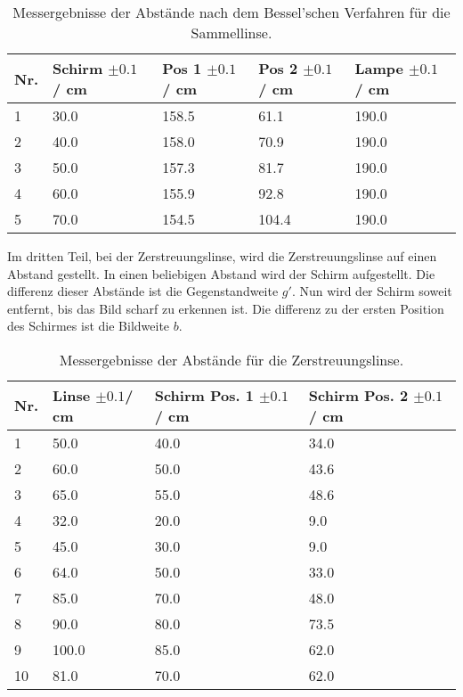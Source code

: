 \documentclass[12pt,a4paper,twoside]{article}
\begin{document}
\begin{table}[H]
    \centering
    \caption{Messergebnisse der Abstände nach dem Bessel'schen Verfahren für die Sammellinse. }
    \label{tab:messergebnisse Bessel}
    \begin{tabular}{| l | l | l | l | l |}
        \hline
        Nr.  & Schirm $\pm 0.1 $ / cm &  Pos 1 $\pm 0.1 $ / cm & Pos 2 $\pm 0.1 $ / cm & Lampe $\pm 0.1 $ / cm \\
        \hline
        1  & 30.0   & 158.5 & 61.1  & 190.0 \\
        2  & 40.0   & 158.0 & 70.9  & 190.0 \\
        3  & 50.0   & 157.3 & 81.7  & 190.0 \\
        4  & 60.0   & 155.9 & 92.8  & 190.0 \\
        5  & 70.0   & 154.5 & 104.4 & 190.0 \\
        \hline
    \end{tabular}
\end{table}
Im dritten Teil, bei der Zerstreuungslinse, wird die Zerstreuungslinse auf einen Abstand gestellt. In einen beliebigen Abstand wird der Schirm aufgestellt. 
Die differenz dieser Abstände ist die Gegenstandweite $g'$. Nun wird der Schirm soweit entfernt, bis das Bild scharf zu erkennen ist. 
Die differenz zu der ersten Position des Schirmes ist die Bildweite $b$. 

\begin{table}[H]
    \centering
    \caption{Messergebnisse der Abstände für die Zerstreuungslinse. }
    \label{tab:messergebnisse Zerstreuungslinse}
    \begin{tabular}{| l | l | l | l |}
        \hline
        Nr.  & Linse $\pm 0.1 $/ cm & Schirm Pos. 1 $\pm 0.1 $ / cm & Schirm Pos. 2 $\pm 0.1 $ / cm \\
        \hline
        1  & 50.0   & 40.0 & 34.0 \\
        2  & 60.0   & 50.0 & 43.6 \\
        3  & 65.0   & 55.0 & 48.6 \\
        4  & 32.0   & 20.0 & 9.0  \\
        5  & 45.0   & 30.0 & 9.0  \\
        6  & 64.0   & 50.0 & 33.0 \\
        7  & 85.0   & 70.0 & 48.0 \\
        8  & 90.0   & 80.0 & 73.5 \\
        9  & 100.0  & 85.0 & 62.0 \\
        10 & 81.0   & 70.0 & 62.0 \\
        \hline
    \end{tabular}
\end{table}
\end{document}

